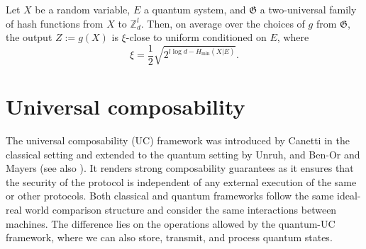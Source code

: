 
\begin{lemma}
Let $X$ be a random variable, $E$ a quantum system, and $\mathfrak{G}$ a two-universal family of hash functions from $X$ to $\mathbb{Z}_d^l$. Then, on average over the choices of $g$  from $\mathfrak{G}$, the output $Z := g(X)$ is $\xi$-close to uniform conditioned on $E$, where
\begin{equation}
  \xi = \frac{1}{2}\sqrt{2^{l\log d - H_\text{min}(X|E)}}.  
\end{equation}
 \label{lem:leftover}
\end{lemma}


\section{Universal composability}

The universal composability (UC) framework was introduced by Canetti \cite{C20} in the classical setting and extended to the quantum setting by Unruh, and Ben-Or and Mayers \cite{Unruh04, BenOrMay04}(see also \cite{Unruh10, FS09}).  It renders strong composability guarantees as it ensures that the security of the protocol is independent of any external execution of the same or other protocols.  Both classical and quantum frameworks follow the same ideal-real world comparison structure and consider the same interactions between machines. The difference lies on the operations allowed by the quantum-UC framework, where we can also store, transmit, and process  quantum states. 

